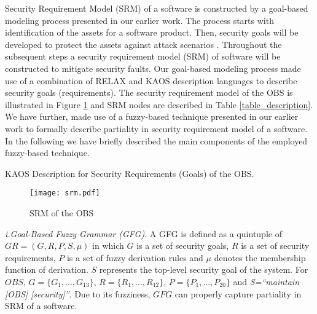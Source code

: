 
Security Requirement Model (SRM) of a software is constructed by a goal-based modeling process presented in our earlier work\cite{mougouei2013goal}. The process starts with identification of the assets \cite{mead2006security,mougouei2013s} for a software product. Then, security goals will be developed to protect the assets against attack scenarios \cite{sindre2005eliciting}. Throughout the subsequent steps a security requirement model (SRM) of software will be constructed to mitigate security faults. Our goal-based modeling process made use of a combination of RELAX \cite{whittle2010relax} and KAOS \cite{van2004elaborating} description languages to describe security goals (requirements). The security requirement model of the OBS is illustrated in Figure \ref{fig_srm} and SRM nodes are described in Table \ref{table_description}. We have further, made use of a fuzzy-based technique presented in our earlier work \cite{mougouei2013fuzzyBased} to formally describe partiality in security requirement model of a software. In the following we have briefly described the main components of the employed fuzzy-based technique. 

\begin{table*}[t]
\caption{KAOS Description for Security Requirements (Goals) of the OBS.}
\label{table_description}
\centering

\end{table*}

\begin{figure}[!h]
	\centering
	\centerline{\texttt{[image: srm.pdf]}}
	\caption{SRM of the OBS}
	\label{fig_srm}
\end{figure}




\textit{i.Goal-Based Fuzzy Grammar (GFG)}. A GFG is defined as a quintuple of $GR = (G, R, P, S, \mu)$ in which $G$ is a set of security goals, $R$ is a set of security requirements, $P$ is a set of fuzzy derivation rules and $\mu$ denotes the membership function of derivation. $S$ represents the top-level security goal of the system. For $OBS$, $G=\{G_{1},...,G_{13}\}$, $R=\{R_{1},...,R_{12}\}$, $P=\{P_{1},...,P_{20}\}$ and \textit{S=``maintain [OBS] [security]''}. Due to its fuzziness, $GFG$ can properly capture partiality in SRM of a software. 

